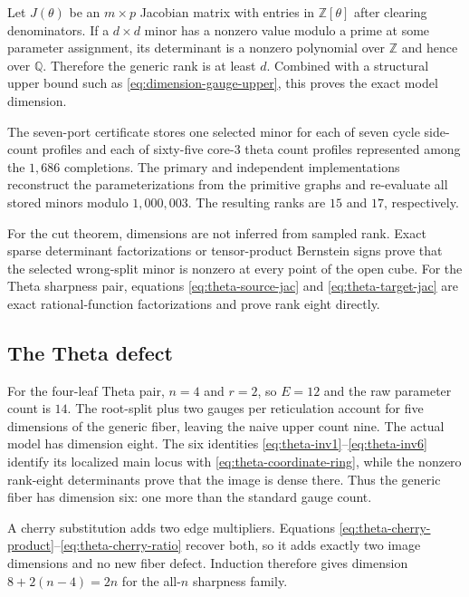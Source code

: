 Let $J(\theta)$ be an $m\times p$ Jacobian matrix with entries in $\mathbb Z[\theta]$ after clearing denominators.  If a $d\times d$ minor has a nonzero value modulo a prime at some parameter assignment, its determinant is a nonzero polynomial over $\mathbb Z$ and hence over $\mathbb Q$.  Therefore the generic rank is at least $d$.  Combined with a structural upper bound such as \eqref{eq:dimension-gauge-upper}, this proves the exact model dimension.

The seven-port certificate stores one selected minor for each of seven cycle side-count profiles and each of sixty-five core-3 theta count profiles represented among the $1{,}686$ completions.  The primary and independent implementations reconstruct the parameterizations from the primitive graphs and re-evaluate all stored minors modulo $1{,}000{,}003$.  The resulting ranks are $15$ and $17$, respectively.

For the cut theorem, dimensions are not inferred from sampled rank.  Exact sparse determinant factorizations or tensor-product Bernstein signs prove that the selected wrong-split minor is nonzero at every point of the open cube.  For the Theta sharpness pair, equations \eqref{eq:theta-source-jac} and \eqref{eq:theta-target-jac} are exact rational-function factorizations and prove rank eight directly.

\subsection{The Theta defect}

For the four-leaf Theta pair, $n=4$ and $r=2$, so $E=12$ and the raw parameter count is $14$.  The root-split plus two gauges per reticulation account for five dimensions of the generic fiber, leaving the naive upper count nine.  The actual model has dimension eight.  The six identities \eqref{eq:theta-inv1}--\eqref{eq:theta-inv6} identify its localized main locus with \eqref{eq:theta-coordinate-ring}, while the nonzero rank-eight determinants prove that the image is dense there.  Thus the generic fiber has dimension six: one more than the standard gauge count.

A cherry substitution adds two edge multipliers.  Equations \eqref{eq:theta-cherry-product}--\eqref{eq:theta-cherry-ratio} recover both, so it adds exactly two image dimensions and no new fiber defect.  Induction therefore gives dimension $8+2(n-4)=2n$ for the all-$n$ sharpness family.
